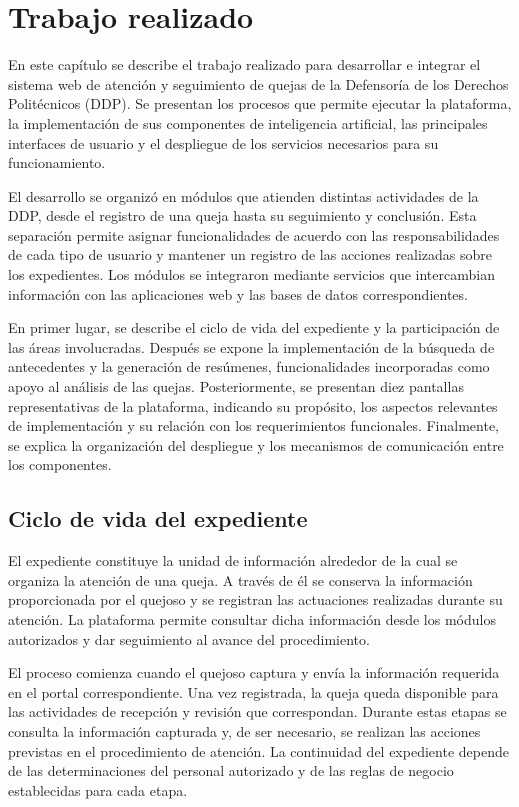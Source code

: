\chapter{Trabajo realizado}
\label{cap:trabajo_realizado}
\label{cap:analisis_diseno}
\label{cap:implementacion}
\label{cap:modulos}

En este capítulo se describe el trabajo realizado para desarrollar e integrar el sistema web de atención y seguimiento de quejas de la Defensoría de los Derechos Politécnicos (DDP). Se presentan los procesos que permite ejecutar la plataforma, la implementación de sus componentes de inteligencia artificial, las principales interfaces de usuario y el despliegue de los servicios necesarios para su funcionamiento.

El desarrollo se organizó en módulos que atienden distintas actividades de la DDP, desde el registro de una queja hasta su seguimiento y conclusión. Esta separación permite asignar funcionalidades de acuerdo con las responsabilidades de cada tipo de usuario y mantener un registro de las acciones realizadas sobre los expedientes. Los módulos se integraron mediante servicios que intercambian información con las aplicaciones web y las bases de datos correspondientes.

En primer lugar, se describe el ciclo de vida del expediente y la participación de las áreas involucradas. Después se expone la implementación de la búsqueda de antecedentes y la generación de resúmenes, funcionalidades incorporadas como apoyo al análisis de las quejas. Posteriormente, se presentan diez pantallas representativas de la plataforma, indicando su propósito, los aspectos relevantes de implementación y su relación con los requerimientos funcionales. Finalmente, se explica la organización del despliegue y los mecanismos de comunicación entre los componentes.

\section{Ciclo de vida del expediente}
\label{sec:ciclo_vida}

El expediente constituye la unidad de información alrededor de la cual se organiza la atención de una queja. A través de él se conserva la información proporcionada por el quejoso y se registran las actuaciones realizadas durante su atención. La plataforma permite consultar dicha información desde los módulos autorizados y dar seguimiento al avance del procedimiento.

El proceso comienza cuando el quejoso captura y envía la información requerida en el portal correspondiente. Una vez registrada, la queja queda disponible para las actividades de recepción y revisión que correspondan. Durante estas etapas se consulta la información capturada y, de ser necesario, se realizan las acciones previstas en el procedimiento de atención. La continuidad del expediente depende de las determinaciones del personal autorizado y de las reglas de negocio establecidas para cada etapa.

